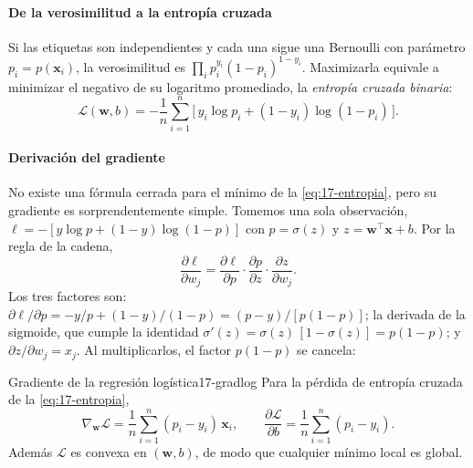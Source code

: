 \paragraph{De la verosimilitud a la entropía cruzada} Si las etiquetas son independientes y cada una sigue una Bernoulli con parámetro $p_i=p(\mathbf{x}_i)$, la verosimilitud es $\prod_i p_i^{y_i}(1-p_i)^{1-y_i}$. Maximizarla equivale a minimizar el negativo de su logaritmo promediado, la \emph{entropía cruzada binaria}:
\begin{equation}\label{eq:17-entropia}
\mathcal{L}(\mathbf{w},b) = -\frac{1}{n}\sum_{i=1}^{n}\Big[\,y_i\log p_i + (1-y_i)\log(1-p_i)\,\Big].
\end{equation}

\begin{simbolos}
\end{simbolos}

\paragraph{Derivación del gradiente} No existe una fórmula cerrada para el mínimo de la \cref{eq:17-entropia}, pero su gradiente es sorprendentemente simple. Tomemos una sola observación, $\ell = -[y\log p + (1-y)\log(1-p)]$ con $p=\sigma(z)$ y $z=\mathbf{w}^\top\mathbf{x}+b$. Por la regla de la cadena,
\[
\frac{\partial \ell}{\partial w_j} = \frac{\partial \ell}{\partial p}\cdot\frac{\partial p}{\partial z}\cdot\frac{\partial z}{\partial w_j}.
\]
Los tres factores son: $\partial\ell/\partial p = -y/p + (1-y)/(1-p) = (p-y)/[p(1-p)]$; la derivada de la sigmoide, que cumple la identidad $\sigma'(z)=\sigma(z)\,[1-\sigma(z)] = p(1-p)$; y $\partial z/\partial w_j = x_j$. Al multiplicarlos, el factor $p(1-p)$ se cancela:

\begin{teorema}{Gradiente de la regresión logística}{17-gradlog}
Para la pérdida de entropía cruzada de la \cref{eq:17-entropia},
\begin{equation}\label{eq:17-gradiente}
\nabla_{\mathbf{w}}\mathcal{L} = \frac{1}{n}\sum_{i=1}^{n}(p_i - y_i)\,\mathbf{x}_i,\qquad
\frac{\partial\mathcal{L}}{\partial b} = \frac{1}{n}\sum_{i=1}^{n}(p_i-y_i).
\end{equation}
Además $\mathcal{L}$ es convexa en $(\mathbf{w},b)$, de modo que cualquier mínimo local es global.
\end{teorema}

